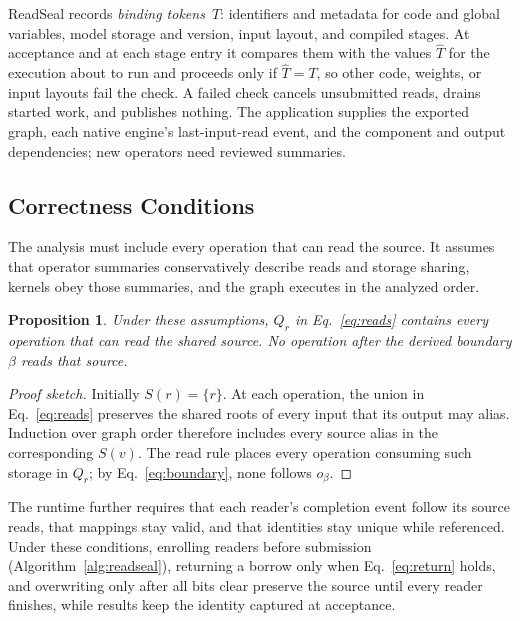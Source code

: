 \documentclass[conference]{IEEEtran}
\newtheorem{proposition}{Proposition}
\begin{document}
ReadSeal records \emph{binding tokens}~$T$: identifiers and metadata for code and global variables, model storage and version, input layout, and compiled stages. At acceptance and at each stage entry it compares them with the values $\hat T$ for the execution about to run and proceeds only if $\hat T=T$, so other code, weights, or input layouts fail the check. A failed check cancels unsubmitted reads, drains started work, and publishes nothing. The application supplies the exported graph, each native engine's last-input-read event, and the component and output dependencies; new operators need reviewed summaries.

\subsection{Correctness Conditions}
\label{sec:correctness}

The analysis must include every operation that can read the source. It assumes that operator summaries conservatively describe reads and storage sharing, kernels obey those summaries, and the graph executes in the analyzed order.

\begin{proposition}
Under these assumptions, $Q_r$ in Eq.~\eqref{eq:reads} contains every operation that can read the shared source. No operation after the derived boundary $\beta$ reads that source.
\end{proposition}

\begin{proof}[Proof sketch]
Initially $S(r)=\{r\}$. At each operation, the union in Eq.~\eqref{eq:reads} preserves the shared roots of every input that its output may alias. Induction over graph order therefore includes every source alias in the corresponding $S(v)$. The read rule places every operation consuming such storage in $Q_r$; by Eq.~\eqref{eq:boundary}, none follows $o_\beta$.
\end{proof}

The runtime further requires that each reader's completion event follow its source reads, that mappings stay valid, and that identities stay unique while referenced. Under these conditions, enrolling readers before submission (Algorithm~\ref{alg:readseal}), returning a borrow only when Eq.~\eqref{eq:return} holds, and overwriting only after all bits clear preserve the source until every reader finishes, while results keep the identity captured at acceptance.

\end{document}
